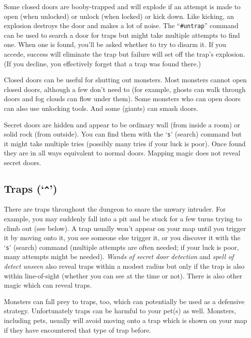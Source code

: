 Some closed doors are booby-trapped and will explode if an attempt is made
to open (when unlocked) or unlock (when locked) or kick down.
Like kicking, an explosion destroys the door and makes a lot of noise.
The ``{\tt \#untrap}'' command can be used to search a door for traps but
might take multiple attempts to find one.
When one is found, you'll be asked whether to try to disarm it.
If you accede, success will eliminate the trap but
failure will set off the trap's explosion.
(If you decline, you effectively forget that a trap was found there.)

Closed doors can be useful for shutting out monsters.
Most monsters cannot open closed doors, although a few don't need to
(for example, ghosts can walk through doors and fog clouds can flow
under them).
Some monsters who can open doors can also use unlocking tools.
And some (giants) can smash doors.

Secret doors are hidden and appear to be ordinary wall (from inside a
room) or solid rock (from outside).
You can find them with the `{\tt s}' (search) command but it might
take multiple tries (possibly many tries if your luck is poor).
Once found they are in all ways equivalent to normal doors.
Mapping magic does not reveal secret doors.

\subsection*{Traps (`{\tt \^{}}')}

There are traps throughout the dungeon to snare the unwary intruder.
For example, you may suddenly fall into a pit and be stuck for a few
turns trying to climb out (see below).
A trap usually won't appear on your map until you trigger it by moving
onto it, you see someone else trigger it, or you discover it with
the `{\tt s}' (search) command (multiple attempts are often needed;
if your luck is poor, many attempts might be needed).
{\it Wands of secret door detection\/} and {\it spell of detect unseen\/}
also reveal traps within a modest radius but only if the trap is also
within line-of-sight (whether you can see at the time or not).
There is also other magic which can reveal traps.

Monsters can fall prey to
traps, too, which can potentially be used as a defensive strategy.
Unfortunately traps can be harmful to your pet(s) as well.
Monsters, including pets, usually will avoid moving onto a trap which
is shown on your map if they have encountered that type of trap before.

